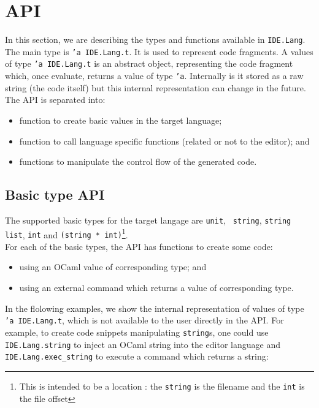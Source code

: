 \section{API}

In this section, we are describing the types and functions available
in {\tt IDE.Lang}. \\

The main type is {\tt 'a IDE.Lang.t}. It is used to represent code
fragments.  A values of type {\tt 'a IDE.Lang.t} is an abstract
object, representing the code fragment which, once evaluate, returns a
value of type {\tt 'a}. Internally is it stored as a raw string (the
code itself) but this internal representation can change in the
future. \\

The API is separated into:

\begin{itemize}
\item function to create basic values in the target language;
\item function to call language specific functions (related or not to
  the editor); and
\item functions to manipulate the control flow of the generated code.
\end{itemize}

\subsection{Basic type API}

The supported basic types for the target langage are {\tt unit}, {\tt
  string}, {\tt string list}, {\tt int} and {\tt(string *
  int)}\footnote{This is intended to be a location : the {\tt string}
  is the filename and the {\tt int} is the file offset}. \\

For each of the basic types, the API has functions to create some code:
\begin{itemize}
\item using an OCaml value of corresponding type; and 
\item using an external command which returns a value of corresponding
  type.
\end{itemize}

In the flolowing examples, we show the internal representation of
values of type {\tt 'a IDE.Lang.t}, which is not available to the user
directly in the API. For example, to create code snippets manipulating
{\tt string}s, one could use {\tt IDE.Lang.string} to inject an OCaml
string into the editor language and {\tt IDE.Lang.exec\_string} to
execute a command which returns a string:

